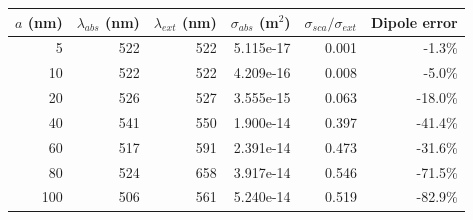 \begin{tabular}{rrrrrr}
\toprule
$a$ (nm)&$\lambda_{abs}$ (nm)&$\lambda_{ext}$ (nm)&$\sigma_{abs}$ (m$^2$)&$\sigma_{sca}/\sigma_{ext}$&Dipole error\\
\midrule
5 & 522 & 522 & 5.115e-17 & 0.001 & -1.3\% \\
10 & 522 & 522 & 4.209e-16 & 0.008 & -5.0\% \\
20 & 526 & 527 & 3.555e-15 & 0.063 & -18.0\% \\
40 & 541 & 550 & 1.900e-14 & 0.397 & -41.4\% \\
60 & 517 & 591 & 2.391e-14 & 0.473 & -31.6\% \\
80 & 524 & 658 & 3.917e-14 & 0.546 & -71.5\% \\
100 & 506 & 561 & 5.240e-14 & 0.519 & -82.9\% \\
\bottomrule
\end{tabular}
